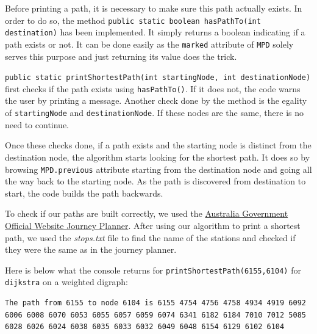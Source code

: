 \documentclass{article}
\begin{document}
Before printing a path, it is necessary to make sure this path actually exists. In order to do so, the method \texttt{public static boolean hasPathTo(int destination)} has been implemented. It simply returns a boolean indicating if a path exists or not. It can be done easily as the \texttt{marked} attribute of \texttt{MPD} solely serves this purpose and just returning its value does the trick.

\texttt{public static printShortestPath(int startingNode, int destinationNode)} first checks if the path exists using \texttt{hasPathTo()}. If it does not, the code warns the user by printing a message. Another check done by the method is the egality of \texttt{startingNode} and \texttt{destinationNode}. If these nodes are the same, there is no need to continue.

Once these checks done, if a path exists and the starting node is distinct from the destination node, the algorithm starts looking for the shortest path. It does so by browsing \texttt{MPD.previous} attribute starting from the destination node and going all the way back to the starting node. As the path is discovered from destination to start, the code builds the path backwards.

To check if our paths are built correctly, we used the \href{https://www.transport.act.gov.au/getting-around/journey-planner}{Australia Government Official Website Journey Planner}. After using our algorithm to print a shortest path, we used the \textit{stops.txt} file to find the name of the stations and checked if they were the same as in the journey planner.

\newpage
Here is below what the console returns for \texttt{printShortestPath(6155,6104)} for \texttt{dijkstra} on a weighted digraph:

\begin{verbatim}
The path from 6155 to node 6104 is 6155 4754 4756 4758 4934 4919 6092 6006 6008 6070 6053 6055 6057 6059 6074 6341 6182 6184 7010 7012 5085 6028 6026 6024 6038 6035 6033 6032 6049 6048 6154 6129 6102 6104
\end{verbatim}
\end{document}
